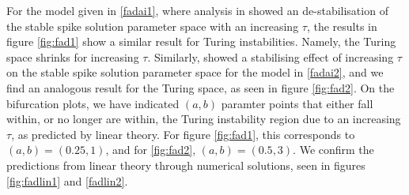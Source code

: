 For the model given in \eqref{fadai1}, where analysis in \cite{fadai1} showed an de-stabilisation of the stable spike solution parameter space with an increasing $\tau$, the results in figure \ref{fig:fad1} show a similar result for Turing instabilities. Namely, the Turing space shrinks for increasing $\tau$. Similarly, \cite{fadai2} showed a stabilising effect of increasing $\tau$ on the stable spike solution parameter space for the model in \eqref{fadai2}, and we find an analogous result for the Turing space, as seen in figure \ref{fig:fad2}. On the bifurcation plots, we have indicated $(a,b)$ paramter points that either fall within, or no longer are within, the Turing instability region due to an increasing $\tau$, as predicted by linear theory. For figure \ref{fig:fad1}, this corresponds to $(a,b)=(0.25,1)$, and for \ref{fig:fad2}, $(a,b)=(0.5,3)$. We confirm the predictions from linear theory through numerical solutions, seen in figures \ref{fig:fadlin1} and \ref{fadlin2}.
